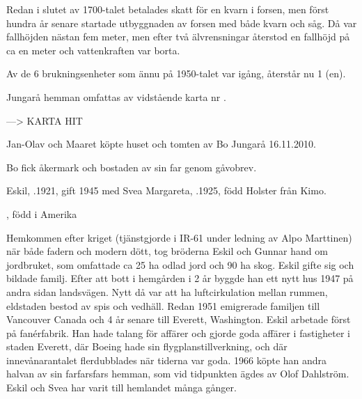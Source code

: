 Redan i slutet av 1700-talet betalades skatt för en kvarn i forsen, men först hundra år senare startade utbyggnaden av forsen med både kvarn och såg. Då var fallhöjden nästan fem meter, men efter två älvrensningar återstod en fallhöjd på ca en meter och vattenkraften var borta.

Av de 6 brukningsenheter som ännu på 1950-talet var igång, återstår nu 1 (en).


Jungarå hemman omfattas av vidstående karta nr .


---> KARTA HIT








Jan-Olav och Maaret köpte huset och tomten av Bo Jungarå 16.11.2010.\jhvspace{}


Bo fick åkermark och bostaden av sin far genom gåvobrev.\jhvspace{}


Eskil, .1921, gift 1945 med Svea Margareta, .1925, född Holster från Kimo.
\begin{jhchildren}
  \item {}
  \item {}, född i Amerika
\end{jhchildren}

Hemkommen efter kriget (tjänstgjorde i IR-61 under ledning av Alpo 	Marttinen) när både fadern och modern dött, tog bröderna Eskil och Gunnar hand om jordbruket, som omfattade ca 25 ha odlad jord och 90 ha skog. Eskil gifte sig och bildade familj. Efter att bott i hemgården i 2 år byggde han ett nytt hus 1947 på andra sidan landsvägen. Nytt då var att ha luftcirkulation mellan rummen, eldstaden bestod av spis och vedhäll. Redan 1951 emigrerade familjen till Vancouver 	Canada och 4 år senare till Everett, Washington. Eskil arbetade först på fanérfabrik. Han hade talang för affärer och gjorde goda affärer i fastigheter i staden Everett, där Boeing hade sin flygplanstillverkning, och där innevånarantalet flerdubblades när tiderna var goda. 1966 köpte han andra halvan av sin farfarsfars hemman, som vid tidpunkten ägdes av Olof Dahlström. Eskil och Svea har varit till hemlandet många gånger.

